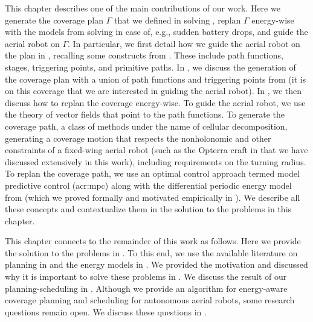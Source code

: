 This chapter describes one of the main contributions of our work. Here we generate the coverage plan $\Gamma$ that we defined in  solving , replan $\Gamma$ energy-wise with the models from  solving  in case of, e.g., sudden battery drops, and guide the aerial robot on $\Gamma$. In particular, we first detail how we guide the aerial robot on the plan in , recalling some constructs from . These include path functions, stages, triggering points, and primitive paths. In , we discuss the generation of the coverage plan with a union of path functions and triggering points from  (it is on this coverage that we are interested in guiding the aerial robot). In , we then discuss how to replan the coverage energy-wise. To guide the aerial robot, we use the theory of vector fields that point to the path functions. To generate the coverage path, a class of methods under the name of cellular decomposition, generating a coverage motion that respects the nonholonomic and other constraints of a fixed-wing aerial robot (such as the Opterra craft in  that we have discussed extensively in this work), including requirements on the turning radius. To replan the coverage path, we use an optimal control approach termed model predictive control (\Gls{acr:mpc}) along with the differential periodic energy model from  (which we proved formally and motivated empirically in ). We describe all these concepts and contextualize them in the solution to the problems in this chapter. 

This chapter connects to the remainder of this work as follows. Here we provide the solution to the problems in . To this end, we use the available literature on planning in  and the energy models in . We provided the motivation and discussed why it is important to solve these problems in . We discuss the result of our planning-scheduling in . Although we provide an algorithm for energy-aware coverage planning and scheduling for autonomous aerial robots, some research questions remain open. We discuss these questions in .


